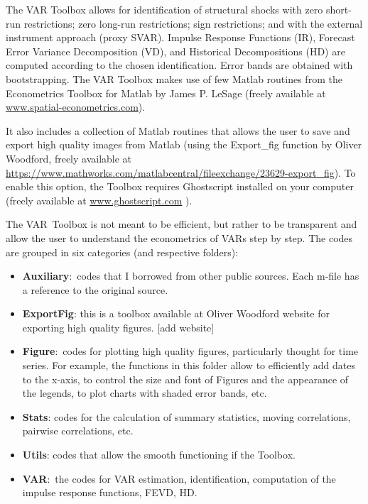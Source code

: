 \documentclass[10pt]{article}
\begin{document}
The VAR Toolbox allows for identification of structural shocks with zero
short-run restrictions; zero long-run restrictions; sign restrictions; and
with the external instrument approach (proxy SVAR). Impulse Response
Functions (IR), Forecast Error Variance Decomposition (VD), and Historical
Decompositions (HD) are computed according to the chosen identification.
Error bands are obtained with bootstrapping. The VAR Toolbox makes use of
few Matlab routines from the Econometrics Toolbox for Matlab by James P.
LeSage (freely available at \href{www.spatial-econometrics.com}{%
www.spatial-econometrics.com}).

It also includes a collection of Matlab routines that allows the user to
save and export high quality images from Matlab (using the Export\_fig
function by Oliver Woodford, freely available at \href{https://www.mathworks.com/matlabcentral/fileexchange/23629-export_fig}%
{https://www.mathworks.com/matlabcentral/fileexchange/23629-export\_fig}).
To enable this option, the Toolbox requires Ghostscript installed on your
computer (freely available at \href{www.ghostscript.com}{www.ghostscript.com}%
).

The VAR\ Toolbox is not meant to be efficient, but rather to be transparent
and allow the user to understand the econometrics of VARs step by step. The
codes are grouped in six categories (and respective folders):

\begin{itemize}
\item \textbf{Auxiliary}:\ codes that I borrowed from other public sources.
Each m-file has a reference to the original source.

\item \textbf{ExportFig}: this is a toolbox available at Oliver Woodford
website for exporting high quality figures. [add website]

\item \textbf{Figure}:\ codes for plotting high quality figures,
particularly thought for time series. For example, the functions in this
folder allow to efficiently add dates to the x-axis, to control the size and
font of Figures and the appearance of the legends, to plot charts with
shaded error bands, etc.

\item \textbf{Stats}: codes for the calculation of summary statistics,
moving correlations, pairwise correlations, etc.

\item \textbf{Utils}: codes that allow the smooth functioning if the Toolbox.

\item \textbf{VAR}:\ the codes for VAR estimation, identification,
computation of the impulse response functions, FEVD, HD.
\end{itemize}
\end{document}
